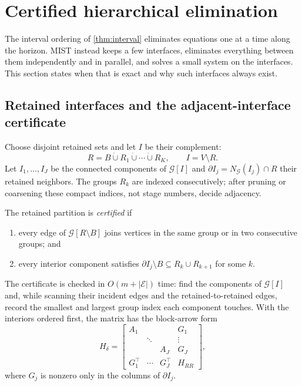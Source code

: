 \section{Certified hierarchical elimination}\label{sec:hierarchy}

The interval ordering of \cref{thm:interval} eliminates equations one at a time
along the horizon. MIST instead keeps a few interfaces, eliminates everything
between them independently and in parallel, and solves a small system on the
interfaces. This section states when that is exact and why such interfaces always
exist.

\subsection{Retained interfaces and the adjacent-interface certificate}

Choose disjoint retained sets and let $I$ be their complement:
\begin{equation}\label{eq:retained}
R=B\mathbin{\dot\cup}R_1\mathbin{\dot\cup}\cdots\mathbin{\dot\cup}R_K,\qquad I=V\setminus R.
\end{equation}
Let $I_1,\ldots,I_J$ be the connected components of $\mathcal G[I]$ and
$\partial I_j=N_{\mathcal G}(I_j)\cap R$ their retained neighbors. The groups
$R_k$ are indexed consecutively; after pruning or coarsening these compact indices,
not stage numbers, decide adjacency.

\begin{definition}\label{def:certificate}
The retained partition is \emph{certified} if
\begin{enumerate}[label=(\roman*),itemsep=1pt]
\item every edge of $\mathcal G[R\setminus B]$ joins vertices in the same group or
  in two consecutive groups; and
\item every interior component satisfies $\partial I_j\setminus B\subseteq R_k\cup R_{k+1}$
  for some $k$.
\end{enumerate}
\end{definition}

The certificate is checked in $O(m+|\mathcal E|)$ time: find the components of
$\mathcal G[I]$ and, while scanning their incident edges and the retained-to-retained
edges, record the smallest and largest group index each component touches. With
the interiors ordered first, the matrix has the block-arrow form
\begin{equation}\label{eq:arrow}
H_\delta=\begin{bmatrix}
A_1&&&G_1\\&\ddots&&\vdots\\&&A_J&G_J\\G_1^\top&\cdots&G_J^\top&H_{RR}
\end{bmatrix},
\end{equation}
where $G_j$ is nonzero only in the columns of $\partial I_j$.

